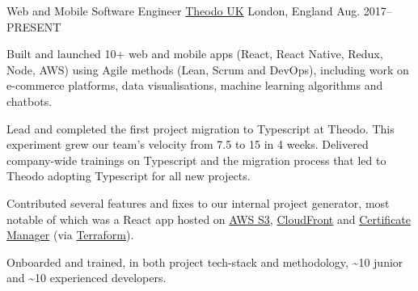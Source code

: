 

\begin{cventries}

  \cventry
    {Web and Mobile Software Engineer} %
    {\href{https://www.theodo.co.uk/}{Theodo UK}} %
    {London, England} %
    {Aug. 2017--\textsc{PRESENT}} %
    {
      \begin{cvitems} %
        \item Built and launched 10+ web and mobile apps (React, React Native, Redux, Node, AWS) using Agile methods (Lean, Scrum and DevOps), including work on e-commerce platforms, data visualisations, machine learning algorithms and chatbots.
        \item Lead and completed the first project migration to Typescript at Theodo. This experiment grew our team's velocity from 7.5 to 15 in 4 weeks. Delivered company-wide trainings on Typescript and the migration process that led to Theodo adopting Typescript for all new projects.
        \item Contributed several features and fixes to our internal project generator, most notable of which was a React app hosted on \href{https://aws.amazon.com/s3/}{AWS S3}, \href{https://aws.amazon.com/cloudfront/}{CloudFront} and \href{https://aws.amazon.com/certificate-manager/}{Certificate Manager} (via \href{https://www.terraform.io/}{Terraform}).
        \item Onboarded and trained, in both project tech-stack and methodology, \textasciitilde{}10 junior and \textasciitilde{}10 experienced developers. 
      \end{cvitems}
    }

\end{cventries}
